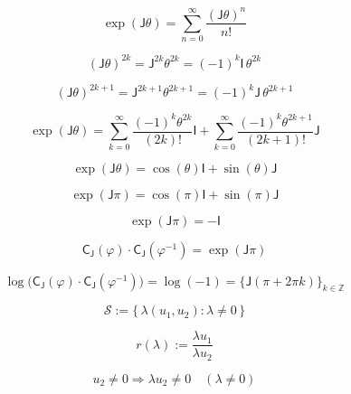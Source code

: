 \documentclass[12pt]{article}
\begin{document}
\begin{equation}
\exp(\mathsf{J}\theta)
=\sum_{n=0}^{\infty}\frac{(\mathsf{J}\theta)^n}{n!}
\end{equation}

\begin{equation}
(\mathsf{J}\theta)^{2k}=\mathsf{J}^{2k}\theta^{2k}=(-1)^k\mathsf{I}\,\theta^{2k}
\end{equation}

\begin{equation}
(\mathsf{J}\theta)^{2k+1}=\mathsf{J}^{2k+1}\theta^{2k+1}=(-1)^k\mathsf{J}\,\theta^{2k+1}
\end{equation}

\begin{equation}
\exp(\mathsf{J}\theta)
=\sum_{k=0}^{\infty}\frac{(-1)^k\theta^{2k}}{(2k)!}\mathsf{I}
+\sum_{k=0}^{\infty}\frac{(-1)^k\theta^{2k+1}}{(2k+1)!}\mathsf{J}
\end{equation}

\begin{equation}
\exp(\mathsf{J}\theta)
=\cos(\theta)\mathsf{I}+\sin(\theta)\mathsf{J}
\end{equation}

\begin{equation}
\exp(\mathsf{J}\pi)=\cos(\pi)\mathsf{I}+\sin(\pi)\mathsf{J}
\end{equation}

\begin{equation}
\exp(\mathsf{J}\pi)=-\mathsf{I}
\end{equation}

\begin{equation}
\mathsf{C}_{\mathsf{J}}(\varphi)\cdot\mathsf{C}_{\mathsf{J}}(\varphi^{-1})=\exp(\mathsf{J}\pi)
\end{equation}

\begin{equation}
\log\!\bigl(\mathsf{C}_{\mathsf{J}}(\varphi)\cdot\mathsf{C}_{\mathsf{J}}(\varphi^{-1})\bigr)=\log(-1)=\bigl\{\mathsf{J}(\pi+2\pi k)\bigr\}_{k\in\mathbb{Z}}
\end{equation}

\begin{equation}
\mathcal{S}:=\bigl\{\,\lambda(u_1,u_2):\lambda\neq 0\,\bigr\}
\end{equation}

\begin{equation}
r(\lambda):=\frac{\lambda u_1}{\lambda u_2}
\end{equation}

\begin{equation}
u_2\neq 0\Rightarrow \lambda u_2\neq 0\quad(\lambda\neq 0)
\end{equation}
\end{document}
